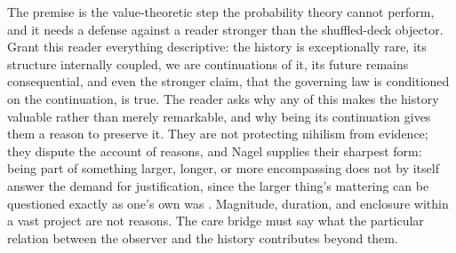 \noindent The premise is the value-theoretic step the probability theory
cannot perform, and it needs a defense against a reader stronger than the
shuffled-deck objector. Grant this reader everything descriptive: the history
is exceptionally rare, its structure internally coupled, we are continuations
of it, its future remains consequential, and even the stronger claim, that
the governing law is conditioned on the continuation, is true. The reader
asks why any of this makes the history valuable rather than merely
remarkable, and why being its continuation gives them a reason to preserve
it. They are not protecting nihilism from evidence; they dispute the account
of reasons, and Nagel supplies their sharpest form: being part of something
larger, longer, or more encompassing does not by itself answer the demand for
justification, since the larger thing's mattering can be questioned exactly as
one's own was \cite{Nagel71}. Magnitude, duration, and enclosure within a
vast project are not reasons. The care bridge must say what the particular
relation between the observer and the history contributes beyond them.

